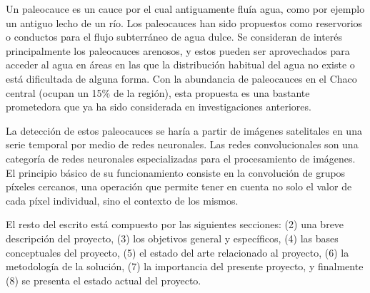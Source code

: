 Un paleocauce es un cauce por el cual antiguamente fluía agua, como por ejemplo un antiguo lecho de un río. Los
paleocauces han sido propuestos como reservorios o conductos para el flujo subterráneo de agua dulce. Se consideran de
interés principalmente los paleocauces arenosos, y estos pueden ser aprovechados para acceder al agua en áreas en las
que la distribución habitual del agua no existe o está dificultada de alguna forma. \autocite{wikipedia-paleochannel}
Con la abundancia de paleocauces en el Chaco central (ocupan un 15\% de la región), esta propuesta es una bastante
prometedora que ya ha sido considerada en investigaciones anteriores. \autocite{conacyt-sistemas-captacion-agua}

La detección de estos paleocauces se haría a partir de imágenes satelitales en una serie temporal por medio de redes
neuronales. Las redes convolucionales son una categoría de redes neuronales especializadas para el procesamiento de
imágenes. El principio básico de su funcionamiento consiste en la convolución de grupos píxeles cercanos, una operación
que permite tener en cuenta no solo el valor de cada píxel individual, sino el contexto de los mismos.
\autocite{axiv-cnn-satellite-imaging}

El resto del escrito está compuesto por las siguientes secciones: (2) una breve descripción del proyecto, (3) los
objetivos general y específicos, (4) las bases conceptuales del proyecto, (5) el estado del arte relacionado al
proyecto, (6) la metodología de la solución, (7) la importancia del presente proyecto, y finalmente (8) se presenta el
estado actual del proyecto.

